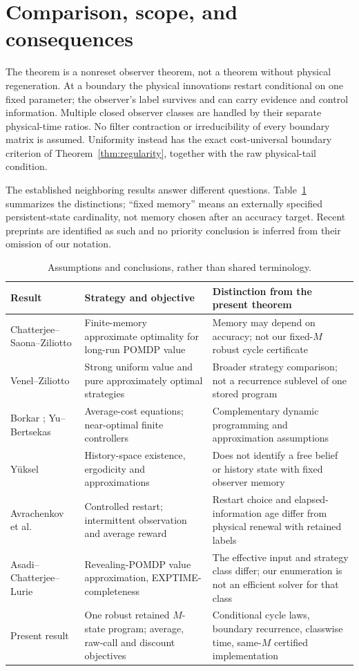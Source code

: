 \section{Comparison, scope, and consequences}\label{sec:comparison}
The theorem is a nonreset observer theorem, not a theorem without physical regeneration. At a boundary the physical innovations restart conditional on one fixed parameter; the observer's label survives and can carry evidence and control information. Multiple closed observer classes are handled by their separate physical-time ratios. No filter contraction or irreducibility of every boundary matrix is assumed. Uniformity instead has the exact cost-universal boundary criterion of Theorem~\ref{thm:regularity}, together with the raw physical-tail condition.

The established neighboring results answer different questions. Table~\ref{tab:comparison} summarizes the distinctions; ``fixed memory'' means an externally specified persistent-state cardinality, not memory chosen after an accuracy target. Recent preprints are identified as such and no priority conclusion is inferred from their omission of our notation.
\begin{table}[ht]
\centering\small
\begin{tabular}{p{}p{}p{}}
\toprule
Result & Strategy and objective & Distinction from the present theorem\\
\midrule
Chatterjee--Saona--Ziliotto \cite{CSZ} & Finite-memory approximate optimality for long-run POMDP value & Memory may depend on accuracy; not our fixed-$M$ robust cycle certificate\\
Venel--Ziliotto \cite{VZ} & Strong uniform value and pure approximately optimal strategies & Broader strategy comparison; not a recurrence sublevel of one stored program\\
Borkar \cite{Borkar}; Yu--Bertsekas \cite{YuBertsekas} & Average-cost equations; near-optimal finite controllers & Complementary dynamic programming and approximation assumptions\\
Y\"uksel \cite{Yuksel} & History-space existence, ergodicity and approximations & Does not identify a free belief or history state with fixed observer memory\\
Avrachenkov et al.\ \cite{APZ,ADK} & Controlled restart; intermittent observation and average reward & Restart choice and elapsed-information age differ from physical renewal with retained labels\\
Asadi--Chatterjee--Lurie \cite{ACL} & Revealing-POMDP value approximation, EXPTIME-completeness & The effective input and strategy class differ; our enumeration is not an efficient solver for that class\\
Present result & One robust retained $M$-state program; average, raw-call and discount objectives & Conditional cycle laws, boundary recurrence, classwise time, same-$M$ certified implementation\\
\bottomrule
\end{tabular}
\caption{Assumptions and conclusions, rather than shared terminology.}\label{tab:comparison}
\end{table}

